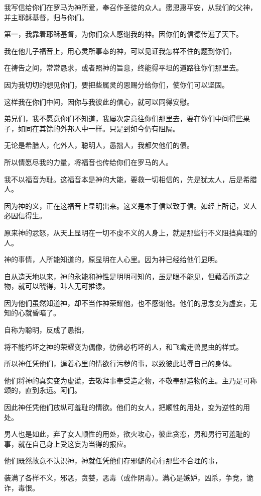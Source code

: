 \documentclass[12pt,oneside]{book}
\begin{document}
我写信给你们在罗马为神所爱，奉召作圣徒的众人。愿恩惠平安，从我们的父神，并主耶稣基督，归与你们。

第一，我靠着耶稣基督，为你们众人感谢我的神。因你们的信德传遍了天下。

我在他儿子福音上，用心灵所事奉的神，可以见证我怎样不住的题到你们，

在祷告之间，常常恳求，或者照神的旨意，终能得平坦的道路往你们那里去。

因为我切切的想见你们，要把些属灵的恩赐分给你们，使你们可以坚固。

这样我在你们中间，因你与我彼此的信心，就可以同得安慰。

弟兄们，我不愿意你们不知道，我屡次定意往你们那里去，要在你们中间得些果子，如同在其馀的外邦人中一样。只是到如今仍有阻隔。

无论是希腊人，化外人，聪明人，愚拙人，我都欠他们的债。

所以情愿尽我的力量，将福音也传给你们在罗马的人。

我不以福音为耻。这福音本是神的大能，要救一切相信的，先是犹太人，后是希腊人。

因为神的义，正在这福音上显明出来。这义是本于信以致于信。如经上所记，义人必因信得生。

原来神的忿怒，从天上显明在一切不虔不义的人身上，就是那些行不义阻挡真理的人。

神的事情，人所能知道的，原显明在人心里。因为神已经给他们显明。

自从造天地以来，神的永能和神性是明明可知的，虽是眼不能见，但藉着所造之物，就可以晓得，叫人无可推诿。

因为他们虽然知道神，却不当作神荣耀他，也不感谢他。他们的思念变为虚妄，无知的心就昏暗了。

自称为聪明，反成了愚拙，

将不能朽坏之神的荣耀变为偶像，彷佛必朽坏的人，和飞禽走兽昆虫的样式。

所以神任凭他们，逞着心里的情欲行污秽的事，以致彼此玷辱自己的身体。

他们将神的真实变为虚谎，去敬拜事奉受造之物，不敬奉那造物的主。主乃是可称颂的，直到永远。阿们。

因此神任凭他们放纵可羞耻的情欲。他们的女人，把顺性的用处，变为逆性的用处。

男人也是如此，弃了女人顺性的用处，欲火攻心，彼此贪恋，男和男行可羞耻的事，就在自己身上受这妄为当得的报应。

他们既然故意不认识神，神就任凭他们存邪僻的心行那些不合理的事，

装满了各样不义，邪恶，贪婪，恶毒（或作阴毒）。满心是嫉妒，凶杀，争竞，诡诈，毒恨。
\end{document}
